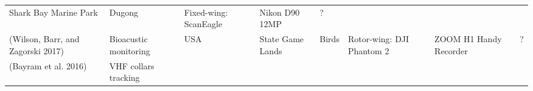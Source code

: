 \documentclass[]{interact}
\theoremstyle{plain}%
\theoremstyle{definition}
\theoremstyle{remark}
\begin{document}
\begin{longtable}[]{@{}llllllll@{}}
\begin{minipage}[t]{0.14\columnwidth}
Shark Bay Marine Park\strut
\end{minipage} & \begin{minipage}[t]{0.10\columnwidth}\raggedright\strut
Dugong\strut
\end{minipage} & \begin{minipage}[t]{0.09\columnwidth}\raggedright\strut
Fixed-wing: ScanEagle\strut
\end{minipage} & \begin{minipage}[t]{0.11\columnwidth}\raggedright\strut
Nikon D90 12MP\strut
\end{minipage} & \begin{minipage}[t]{0.01\columnwidth}\raggedright\strut
?\strut
\end{minipage}\tabularnewline
\begin{minipage}[t]{0.11\columnwidth}\raggedright\strut
(Wilson, Barr, and Zagorski 2017)\strut
\end{minipage} & \begin{minipage}[t]{0.18\columnwidth}\raggedright\strut
Bioacustic monitoring\strut
\end{minipage} & \begin{minipage}[t]{0.03\columnwidth}\raggedright\strut
USA\strut
\end{minipage} & \begin{minipage}[t]{0.14\columnwidth}\raggedright\strut
State Game Lands\strut
\end{minipage} & \begin{minipage}[t]{0.10\columnwidth}\raggedright\strut
Birds\strut
\end{minipage} & \begin{minipage}[t]{0.09\columnwidth}\raggedright\strut
Rotor-wing: DJI Phantom 2\strut
\end{minipage} & \begin{minipage}[t]{0.11\columnwidth}\raggedright\strut
ZOOM H1 Handy Recorder\strut
\end{minipage} & \begin{minipage}[t]{0.01\columnwidth}\raggedright\strut
?\strut
\end{minipage}\tabularnewline
\begin{minipage}[t]{0.11\columnwidth}\raggedright\strut
(Bayram et al. 2016)\strut
\end{minipage} & \begin{minipage}[t]{0.18\columnwidth}\raggedright\strut
VHF collars tracking\strut
\end{minipage} & \begin{minipage}[t]{0.03\columnwidth}\raggedright\strut

\end{minipage}
\end{longtable}
\end{document}
